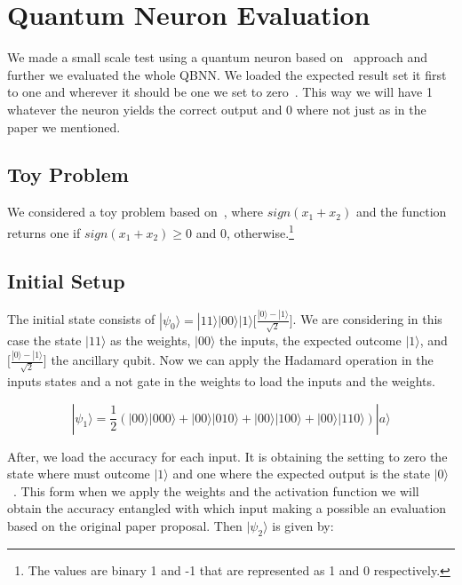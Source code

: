 \documentclass[conference]{IEEEtran}
\begin{document}
\section{Quantum Neuron Evaluation}\label{sec:quantum-neuron-evaluation}

 We made a small scale test using a quantum neuron based on~\cite{fawaz2019training} approach and further we evaluated
 the whole QBNN.
 We loaded the expected result set it first to one and wherever it should be one we set to zero~\cite{fawaz2019training}.
 This way we will have 1 whatever the neuron yields the correct output and 0 where not just as in the paper we mentioned.

 \subsection*{Toy Problem}
    We considered a toy problem based on~\cite{fawaz2019training}, where \(sign(x_1 + x_2)\) and the function returns one
    if \(sign(x_1 + x_2) \geq 0\) and 0, otherwise.\footnote{The values are binary 1 and -1 that are represented as 1
    and 0 respectively.}

\subsection{Initial Setup}\label{subsec:initial-setup}


The initial state consists of \(|\psi_0\rangle = |11\rangle|00\rangle|1\rangle\Big[\frac{|0\rangle - |1\rangle}{\sqrt{2}}\Big]\).
We are considering in this case the state \(|11\rangle\) as the weights, \(|00\rangle\) the inputs, the expected outcome \(|1\rangle\), and
\(\Big[\frac{|0\rangle - |1\rangle}{\sqrt{2}}\Big]\) the ancillary qubit.
Now we can apply the Hadamard operation in the inputs states and a not gate in the weights to load the inputs and the weights.

\begin{equation}
|\psi_1\rangle = \frac{1}{2}(|00\rangle|000\rangle + |00\rangle|010\rangle + |00\rangle|100\rangle + |00\rangle|110\rangle)
|a\rangle
\end{equation}

After, we load the accuracy for each input.
It is obtaining the setting to zero the state where must outcome \(|1\rangle\) and one where the
expected output is the state $|0\rangle$~\cite{fawaz2019training}.
This form when we apply the weights and the activation function we will obtain the accuracy entangled with which input
making a possible an evaluation based on the original paper proposal.
Then \(|\psi_2\rangle\) is given by:
\end{document}
